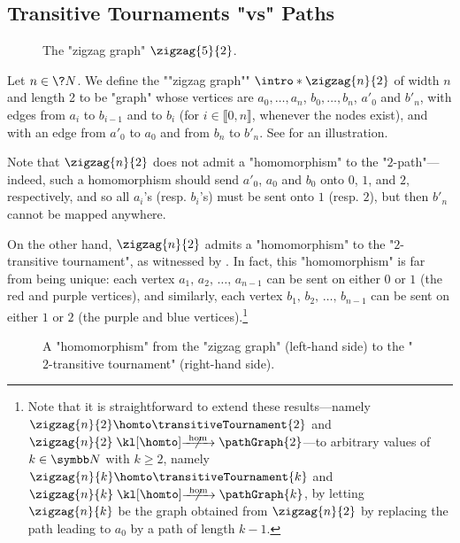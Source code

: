 \subsection{Transitive Tournaments "vs" Paths}

\begin{figure}
	\centering
	\begin{tikzpicture}
		
		
	\end{tikzpicture}
	\caption{\AP\label{fig:zigzag-graph}The "zigzag graph" $\zigzag{5}{2}$.}
\end{figure}
\begin{example}
	\AP\label{ex:zigzag-defn}
	Let $n\in\?N$.
	We define the \AP""zigzag graph"" $\intro*\zigzag{n}{2}$ of width $n$ and length 2
	to be "graph" whose vertices are $a_0, \hdots, a_n$, $b_0, \hdots, b_{n}$,
	$a'_0$ and $b'_n$, with edges from $a_i$ to $b_{i-1}$ and to $b_{i}$ (for $i \in \lBrack 0,n\rBrack$, whenever the nodes exist), and with an edge from $a'_0$ to $a_0$ and from $b_n$
	to $b'_n$. See  for an illustration.
	
	Note that $\zigzag{n}{2}$ does not admit a "homomorphism" to the "$2$-path"---indeed, such a homomorphism should send $a'_0$, $a_0$ and $b_0$ onto $0$, $1$, and $2$, respectively, 
	and so all $a_i$'s (resp. $b_i$'s) must be sent onto $1$ (resp. $2$), but then $b'_n$ cannot be mapped anywhere.

	On the other hand, $\zigzag{n}{2}$ admits a "homomorphism" to the "$2$-transitive tournament", as witnessed by .
	In fact, this "homomorphism" is far from being unique:
	each vertex $a_1,\,a_2,\,\hdots,\,a_{n-1}$ can be sent on either $0$ or $1$
	(the red and purple vertices), 
	and similarly, each vertex $b_1,\,b_2,\,\hdots,\,b_{n-1}$ can be sent on either $1$ or $2$
	(the purple and blue vertices).\footnote{Note that it is straightforward
	to extend these results---namely $\zigzag{n}{2} \homto \transitiveTournament{2}$
	and $\zigzag{n}{2} \nothomto \pathGraph{2}$---to arbitrary values of $k\in \N$ with
	$k\geq 2$, namely $\zigzag{n}{k} \homto \transitiveTournament{k}$
	and $\zigzag{n}{k} \nothomto \pathGraph{k}$, by letting
	$\zigzag{n}{k}$ be the graph obtained from $\zigzag{n}{2}$ by
	replacing the path leading to $a_0$ by a path of length $k-1$.
	}
\end{example}
\begin{figure}
	\centering 
	\begin{tikzpicture}
		
	\end{tikzpicture}
	\caption{\AP\label{fig:zigzag-graph-hom-T2}A "homomorphism" from the "zigzag graph" (left-hand side) to the "$2$-transitive tournament" (right-hand side).}
\end{figure}